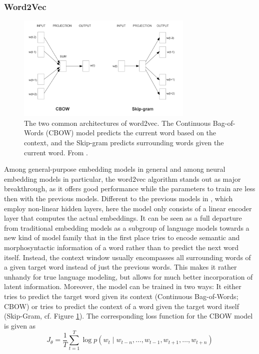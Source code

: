 \documentclass[11pt]{article}
\begin{document}
\subsubsection{Word2Vec}
\begin{figure}[htbp] %
   \centering
   \includegraphics[width=0.75\textwidth]{word2vec} 
   \caption{The two common architectures of word2vec. The Continuous Bag-of-Words (CBOW) model predicts the current word based on the
context, and the Skip-gram predicts surrounding words given the current word. From \cite{mikolov2013efficient}.}
   \label{fig:word2vec}
\end{figure}
Among general-purpose embedding models in general and among neural embedding models in particular, the word2vec algorithm \cite{mikolov2013efficient,mikolov2013distributed} stands out as major breakthrough, as it offers good performance while the parameters to train are less then with the previous models. Different to the previous models in \cite{bengio2003neural,collobert2008unified}, which employ non-linear hidden layers, here the model only consists of a linear encoder layer that computes the actual embeddings. It can be seen as a full departure from traditional embedding models as a subgroup of language models towards a new kind of model family that in the first place tries to encode semantic and morphosyntactic information of a word rather than to predict the next word itself. Instead, the context window usually encompasses all surrounding words of a given target word instead of just the previous words. This makes it rather unhandy for true language modeling, but allows for much better incorporation of latent information. Moreover, the model can be trained in two ways: It either tries to predict the target word given its context (Continuous Bag-of-Words; CBOW) or tries to predict the context of a word given the target word itself (Skip-Gram, cf. Figure \ref{fig:word2vec}). The corresponding loss function for the CBOW model is given as 
\begin{equation}
J_{\theta} = \frac{1}{T} \sum_{t=1}^{T}\log p(w_{t}\mid w_{t-n},\dots,w_{t-1},w_{t+1},\dots,w_{t+n})
\label{eq:CBOW_loss}
\end{equation}
\end{document}
